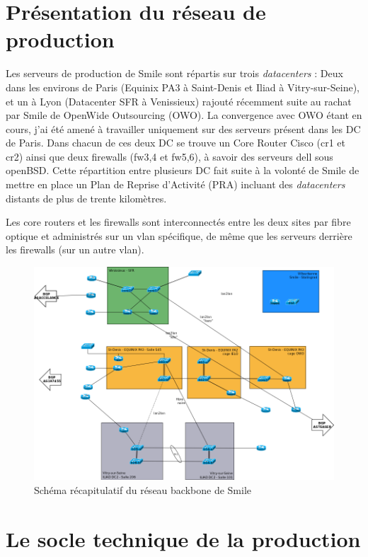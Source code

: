 \documentclass[14 pt,a4paper]{extreport}
\begin{document}
\section{Présentation du réseau de production}

Les serveurs de production de Smile sont répartis sur trois \emph{datacenters} : Deux dans les environs de Paris (Equinix PA3 à Saint-Denis et Iliad à Vitry-sur-Seine), et un à Lyon (Datacenter SFR à Venissieux) rajouté récemment suite au rachat par Smile de OpenWide Outsourcing (OWO). La convergence avec OWO étant en cours, j'ai été amené à travailler uniquement sur des serveurs présent dans les DC de Paris. Dans chacun de ces deux DC se trouve un Core Router Cisco (cr1 et cr2) ainsi que deux firewalls (fw3,4 et fw5,6), à savoir des serveurs dell sous openBSD. Cette répartition entre plusieurs DC fait suite à la volonté de Smile de mettre en place un Plan de Reprise d'Activité (PRA) incluant des \emph{datacenters} distants de plus de trente kilomètres.

Les core routers et les firewalls sont interconnectés entre les deux sites par fibre optique et administrés sur un vlan spécifique, de même que les serveurs derrière les firewalls (sur un autre vlan).

\begin{figure}[htp]
\centering
\includegraphics[scale=0.4]{reseau_backbone.png}
\caption{Schéma récapitulatif du réseau backbone de Smile}
\label{}
\end{figure}
\section{Le socle technique de la production}
\end{document}
